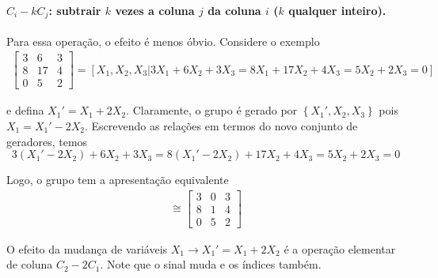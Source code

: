     	\paragraph{$C_i - kC_j$: subtrair $k$ vezes a coluna $j$ da coluna $i$ ($k$ qualquer inteiro).} 
    	Para essa operação, o efeito é menos óbvio. Considere o exemplo
    	\begin{align*}
        	\begin{bmatrix}
        	3 & 6 & 3 \\
        	8 & 17 & 4 \\
        	0 & 5 & 2
        	\end{bmatrix} 
        	= [X_1, X_2, X_3 \vert 3X_1 + 6X_2 + 3X_3 = 8X_1 + 17X_2 + 4X_3 = 5X_2 + 2X_3 = 0] 
    	\end{align*}
    	\par\vspace{0.3cm} e defina $X_1' = X_1+2X_2$. Claramente, o grupo é gerado por 
    	$\left\{ X_1', X_2, X_3 \right\}$ pois $X_1 = X_1' - 2X_2$. Escrevendo as relações em termos 
    	do novo conjunto de geradores, temos
    	\begin{equation*}
    	    3(X_1' - 2X_2) + 6X_2  + 3X_3 = 8(X_1' - 2X_2) + 17X_2 + 4X_3 = 5X_2 + 2X_3 = 0
    	\end{equation*} 
    	\par\vspace{0.3cm} Logo, o grupo tem a apresentação equivalente
    	\begin{align*}
        	[X_1', X_2, X_3 \vert 3X_1' + 3X_3 = 8X_1' + X_2 + 4X_3 = 5X_2 + 2X_3 = 0] \cong 
        	\begin{bmatrix}
        	3 & 0 & 3 \\
        	8 & 1 & 4  \\
        	0 & 5 & 2
        	\end{bmatrix}
    	\end{align*}
    	\par\vspace{0.3cm} O efeito da mudança de variáveis $X_1\to X_1' = X_1 + 2X_2$ é a operação 
    	elementar de coluna $C_2 - 2C_1$. Note que o sinal muda e os índices também.
    	
